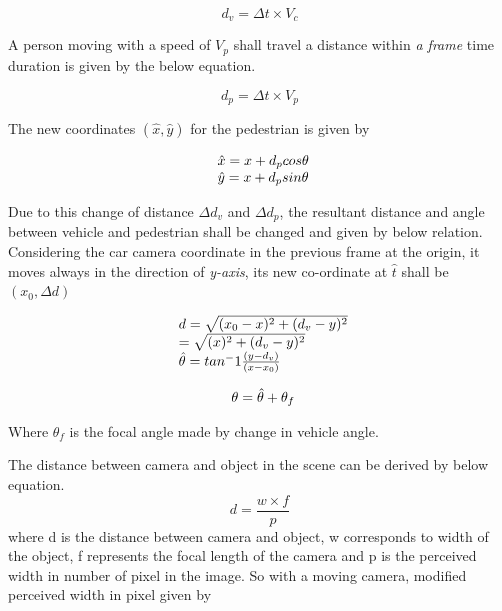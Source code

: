 \begin{equation}
d_v = \Delta t \times V_c
\end{equation}

A person moving with a speed of $V_p$ shall travel a distance within \textit{a frame }time duration is given by the below equation.

\begin{equation}
d_p = \Delta t \times V_p
\end{equation}

The new coordinates $(\hat{x}, \hat{y})$ for the pedestrian is given by

\begin{equation}
\begin{array}{l@{}}
\hat{x} =x + d_p cos\theta \\
\hat{y} =x + d_p sin\theta
\end{array}			
\end{equation}

Due to this change of distance $\Delta d_v$ and $\Delta d_p$, the resultant distance and angle between vehicle and pedestrian shall be changed and given by below relation. Considering the car camera coordinate in the previous frame at the origin, it moves always in the direction of \textit{y-axis}, its new co-ordinate at $\hat{t}$ shall be $(x_0, \Delta d)$

\begin{equation}
\begin{array}{l@{}}
d =\sqrt{(x_0 - x)^2 + (d_v - y)^2} \\
	=\sqrt{(x)^2 + (d_v - y)^2} \\
\hat{\theta }= tan^-1\frac{(y-d_v)}{(x-x_0)} \\
\end{array}
\end{equation}

\begin{equation}
\begin{array}{l@{}}
\theta =\hat{\theta } + {\theta }_f\\
\end{array}			
\end{equation}

Where ${\theta }_f$ is the focal angle made by change in vehicle angle.

The distance between camera and object in the scene can be derived by below equation.
\begin{equation}
d = \frac{w \times f}{p}
\end{equation}
where d is the distance between camera and object, w corresponds to width of the object, f represents the focal length of the camera and p is the perceived width in number of pixel in the image.
So with a moving camera, modified perceived width in pixel given by

